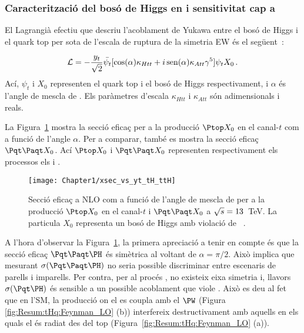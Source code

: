  
\subsubsection{Caracterització del bosó de Higgs en \tH i sensitivitat cap a \yt }

El Lagrangià efectiu que descriu l'acoblament de Yukawa entre el bosó de Higgs i el quark top 
per sota de l'escala de ruptura de la simetria EW és el següent~\cite{Demartin:2015uha}:

\begin{equation*}
\label{eq:Resum:Lagrangian:tHq:b}
\mathcal{L} = -\frac{y_{t}}{\sqrt{2}}\bar{\psi_{t}}[\text{cos}(\alpha)\kappa_{Htt} +  i\,\text{sen}(\alpha)\kappa_{Att} \gamma^{5}]\psi_{t}X_{0}\, .
\end{equation*}
Ací, $\psi_{t}$ i $X_{0}$ representen el quark top i el bosó de Higgs respectivament, 
i $\alpha$ és l'angle de mescla de \CP. Els paràmetres d'escala $\kappa_{Htt}$ i $\kappa_{Att}$ 
són adimensionals i reals.

La Figura~\ref{fig:Resum:xsec_vs_yt_tH_ttH} mostra la secció eficaç per a la producció 
$\Ptop X_{0}$ en el canal-$t$ com a funció de l'angle $\alpha$. Per a comparar, també 
es mostra la secció eficaç $\ttbar X_0$.  Ací $\Ptop X_{0}$ i $\ttbar X_{0}$ representen
respectivament els processos els \tH i \ttH.

\begin{figure}[h]
    \centering
    \texttt{[image: Chapter1/xsec\_vs\_yt\_tH\_ttH]}
    \caption{Secció eficaç a NLO com a funció de l'angle de mescla de \CP 
    per a la producció $\Ptop X_{0}$ en el canal-$t$ i $\ttbar X_0$ a $\sqrt{s} = 13$~TeV. 
    La particula $X_0$ representa un bosó de Higgs amb violació de \CP~\cite{Demartin:2015uha}.}
    \label{fig:Resum:xsec_vs_yt_tH_ttH}
\end{figure}

A l'hora d'observar la Figura~\ref{fig:Resum:xsec_vs_yt_tH_ttH}, la primera apreciació a tenir en compte és que 
la secció eficaç $\ttH$ és simètrica al voltant de $\alpha = \pi/2$. Això implica que mesurant 
$\sigma(\ttH)$ no seria possible discriminar entre escenaris de \CP parells i imparells. 
Per contra, per al procés \tH, no existeix eixa simetria i, llavors $\sigma(\tH)$ és sensible
a un possible acoblament que viole \CP.
Això es deu al fet que en l'SM, la producció \tHq on el \PHiggs es coupla amb el $\PW$ (Figura
\ref{fig:Resum:tHq:Feynman_LO} (b)) interfereix destructivament amb aquells en els quals el
\PH és radiat des del top (Figura~\ref{fig:Resum:tHq:Feynman_LO} (a)).




